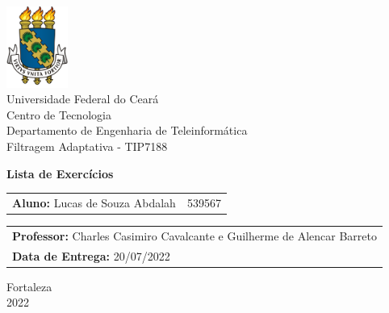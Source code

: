 \begin{titlepage}
    \begin{center}
        \includegraphics[width=2cm]{adj/brasao.png}\\
        {\large {Universidade Federal do Ceará}}\\
        {\large {Centro de Tecnologia}}\\
        {\large {Departamento de Engenharia de Teleinformática}}\\
        {\large {Filtragem Adaptativa - TIP7188}}
    \end{center}

    \vspace{100pt}
    
    \begin{center}
        {\large \textbf {Lista de Exercícios}}
    \end{center}
    
    \vspace{100pt}
    
    \begin{table}[h]
    \begin{tabular}{ll}
        \textbf{Aluno:} Lucas de Souza Abdalah & 539567 \\
    \end{tabular}
    \end{table}
    
    \begin{table}[h]
    \begin{tabular}{l}
        \textbf{Professor:} Charles Casimiro Cavalcante e Guilherme de Alencar Barreto \\
        \textbf{Data de Entrega:} 20/07/2022
    \end{tabular}
    \end{table}
    
    \vspace{\fill}
    
    \begin{center}
        Fortaleza\\
        2022
    \end{center}
    
    \end{titlepage}
    
    
    \tableofcontents
    \thispagestyle{empty}
    \clearpage